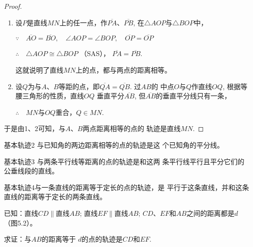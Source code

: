 \begin{proof}
\begin{enumerate}
    \item 
设$P$是直线$MN$上的任一点，作$\overline{PA}$、$\overline{PB}$,
在$\triangle AOP$与$\triangle BOP$中，

$\because\quad \overline{AO}=\overline{BO},\quad \angle AOP=\angle BOP,\quad \overline{OP}=\overline{OP}$

$\therefore\quad \triangle AOP\cong \triangle BOP$ （SAS），
$\overline{PA}=\overline{PB}$.

这就说明了直线$MN$上的点，都与两点的距离相等。

\item 设$Q$为与$A$、$B$等距的点，即$\overline{QA}=\overline{QB}$. 过$AB$的
中点$O$与$Q$作直线$OQ$, 根据等腰三角形的性质，直线$OQ$
垂直平分$\overline{AB}$, 但$\overline{AB}$的垂直平分线只有一条，

$\therefore\quad MN$与$OQ$重合，$Q\in MN$.

\end{enumerate}

于是由1、2可知，与$A$、$B$两点距离相等的点的
轨迹是直线$MN$.
\end{proof}

\begin{blk}
{基本轨迹2} 与已知角的两边距离相等的点的轨迹是这
个已知角的平分线。
\end{blk}

\begin{blk}
{基本轨迹3} 与两条平行线等距离的点的轨迹是和这两
条平行线平行且平分它们的公垂线段的直线。
\end{blk}

\begin{blk}
    {基本轨迹4}与一条直线的距离等于定长的点的轨迹，是
    平行于这条直线，并和这条直线的距离等于定长的两条直线。
\end{blk}

已知：直线$CD\parallel$直线$AB$; 直线$EF\parallel$直线$AB$; $CD$、$EF$和$AB$之间的距离都是$d$（图5.2）。

求证：与$AB$的距离等于
$d$的点的轨迹是$CD$和$EF$.

\begin{figure}[htp]
    \centering
{}
    
    \caption{}
\end{figure}


